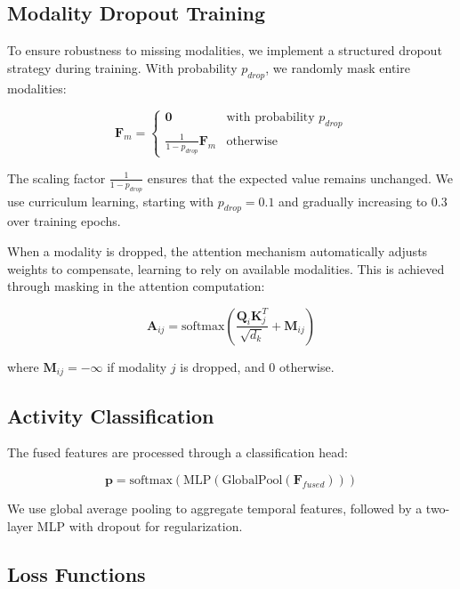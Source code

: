 \documentclass[10pt,twocolumn]{article}
\begin{document}
\subsection{Modality Dropout Training}

To ensure robustness to missing modalities, we implement a structured dropout strategy during training. With probability $p_{drop}$, we randomly mask entire modalities:

\begin{equation}
\mathbf{F}_m = \begin{cases}
\mathbf{0} & \text{with probability } p_{drop} \\
\frac{1}{1-p_{drop}} \mathbf{F}_m & \text{otherwise}
\end{cases}
\end{equation}

The scaling factor $\frac{1}{1-p_{drop}}$ ensures that the expected value remains unchanged. We use curriculum learning, starting with $p_{drop} = 0.1$ and gradually increasing to $0.3$ over training epochs.

When a modality is dropped, the attention mechanism automatically adjusts weights to compensate, learning to rely on available modalities. This is achieved through masking in the attention computation:

\begin{equation}
\mathbf{A}_{ij} = \text{softmax}\left(\frac{\mathbf{Q}_i \mathbf{K}_j^T}{\sqrt{d_k}} + \mathbf{M}_{ij}\right)
\end{equation}

where $\mathbf{M}_{ij} = -\infty$ if modality $j$ is dropped, and 0 otherwise.

\subsection{Activity Classification}

The fused features are processed through a classification head:

\begin{equation}
\mathbf{p} = \text{softmax}(\text{MLP}(\text{GlobalPool}(\mathbf{F}_{fused})))
\end{equation}

We use global average pooling to aggregate temporal features, followed by a two-layer MLP with dropout for regularization.

\subsection{Loss Functions}
\end{document}
